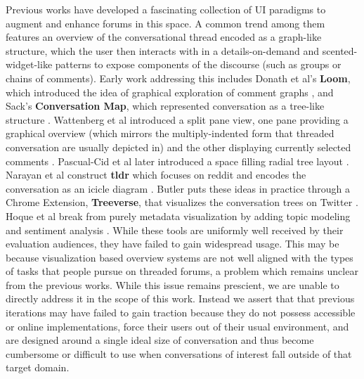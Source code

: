 \documentclass{egpubl}
\begin{document}
Previous works have developed a fascinating collection of UI paradigms to augment and enhance forums in this space. 
%
A common trend among them features an overview of the conversational thread encoded as a graph-like structure, which the user then interacts with in a details-on-demand \cite{shneiderman1996eyes} and scented-widget-like \cite{willett2007scented} patterns to expose components of the discourse (such as groups or chains of comments). 
%
 Early work addressing this includes Donath et al's \textbf{Loom}, which introduced the idea of graphical exploration of comment graphs \cite{donath1999visualizing}, and Sack's \textbf{Conversation Map}, which represented conversation as a tree-like structure \cite{sack2000conversation}. 
 Wattenberg et al introduced a split pane view, one pane providing a graphical overview (which mirrors the multiply-indented form that threaded conversation are usually depicted in) and the other displaying currently selected comments \cite{wattenberg2003conversation, dave2004flash}.
% 
Pascual-Cid et al later introduced a space filling radial tree layout \cite{pascual2009exploring}. 
%
Narayan et al construct \textbf{tldr} which focuses on reddit and encodes the conversation as an icicle diagram \cite{narayan2010not}. 
%
Butler puts these ideas in practice through a Chrome Extension, \textbf{Treeverse}, that visualizes the conversation trees on Twitter \cite{treeverse}.
%
Hoque et al break from purely metadata visualization by adding topic modeling and sentiment analysis  \cite{hoque2014convis, hoque2016interactive}.
%
While these tools are uniformly well received by their evaluation audiences, they have failed to gain widespread usage.
%
This may be because visualization based overview systems are not well aligned with the types of tasks that people pursue on threaded forums, a problem which remains unclear from the previous works.
%
While this issue remains prescient, we are unable to directly address it in the scope of this work.
%
Instead we assert that that previous iterations may have failed to gain traction because they do not possess accessible or online implementations, force their users out of their usual environment, and are designed around a single ideal size of conversation and thus become cumbersome or difficult to use when conversations of interest fall outside of that target domain.
\end{document}
